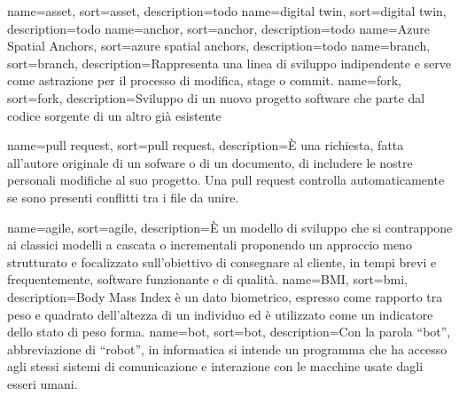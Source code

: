 
\renewcommand{\acronymname}{Acronimi e abbreviazioni}




\renewcommand{\glsnamefont}[1]{\makefirstuc{#1}}


{
    name=asset,
    sort=asset,
    description={todo}
}
{
    name=digital twin,
    sort=digital twin,
    description={todo}
}
{
    name=anchor,
    sort=anchor,
    description={todo}
}
{
    name=Azure Spatial Anchors,
    sort=azure spatial anchors,
    description={todo}
}
{
    name=branch,
    sort=branch,
    description={Rappresenta una linea di sviluppo indipendente e serve come astrazione per il processo di modifica,
stage o commit.}
}
{
    name=fork,
    sort=fork,
    description={Sviluppo di un nuovo progetto software che parte dal codice sorgente di un altro già esistente}
}

{
    name=pull request,
    sort=pull request,
    description={È una richiesta, fatta all’autore originale di un sofware o di un documento, di includere le nostre personali modifiche al suo progetto. Una pull request controlla automaticamente se sono presenti conflitti tra i file da unire.}
}

{
    name=agile,
    sort=agile,
    description={È un modello di sviluppo che si contrappone ai classici modelli a cascata o incrementali proponendo un approccio meno strutturato e focalizzato sull'obiettivo di consegnare al cliente, in tempi brevi e frequentemente, software funzionante e di qualità. }
}
{
    name=BMI,
    sort=bmi,
    description={Body Mass Index è un dato biometrico, espresso come rapporto tra peso e quadrato dell'altezza di un individuo ed è utilizzato come un indicatore dello stato di peso forma. }
}
{
    name=bot,
    sort=bot,
    description={Con la parola “bot”, abbreviazione di “robot”, in informatica si intende un programma che ha accesso agli stessi sistemi di comunicazione e interazione con le macchine usate dagli esseri umani.}
}

